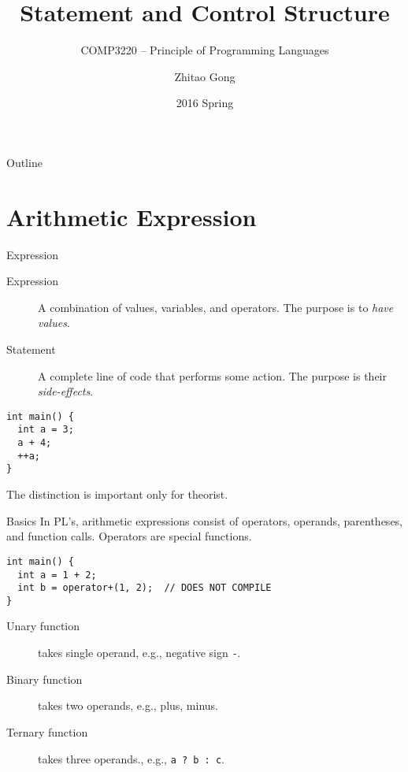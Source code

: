 \documentclass[presentation]{beamer}
\author{Zhitao Gong}
\date{2016 Spring}
\title{Statement and Control Structure}
\subtitle{COMP3220 -- Principle of Programming Languages}
\begin{document}
\maketitle
\begin{frame}{Outline}
\setcounter{tocdepth}{2}
\tableofcontents
\end{frame}


\section{Arithmetic Expression}
\label{sec:orgheadline18}

\begin{frame}[fragile,label={sec:orgheadline1}]{Expression}
 \begin{description}
\item[{Expression}] A combination of values, variables, and operators.
The purpose is to \emph{have values}.
\item[{Statement}] A complete line of code that performs some action.
The purpose is their \emph{side-effects}.
\end{description}


\begin{verbatim}
int main() {
  int a = 3;
  a + 4;
  ++a;
}
\end{verbatim}

The distinction is important only for theorist.
\end{frame}

\begin{frame}[fragile,label={sec:orgheadline2}]{Basics}
 In PL's, arithmetic expressions consist of operators, operands,
parentheses, and function calls.  Operators are special functions.

\begin{verbatim}
int main() {
  int a = 1 + 2;
  int b = operator+(1, 2);  // DOES NOT COMPILE
}
\end{verbatim}

\begin{description}
\item[{Unary function}] takes single operand, e.g., negative sign \texttt{-}.
\item[{Binary function}] takes two operands, e.g., plus, minus.
\item[{Ternary function}] takes three operands., e.g., \texttt{a ? b : c}.
\end{description}
\end{frame}
\end{document}
